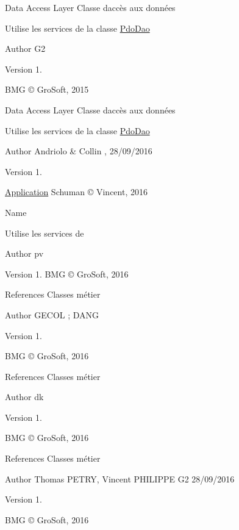Data Access Layer Classe d\textquotesingle{}accès aux données

Utilise les services de la classe \hyperlink{class_pdo_dao}{Pdo\+Dao}

\begin{DoxyAuthor}{Author}
G2 
\end{DoxyAuthor}
\begin{DoxyVersion}{Version}
1.
\end{DoxyVersion}
B\+MG © Gro\+Soft, 2015

Data Access Layer Classe d\textquotesingle{}accès aux données

Utilise les services de la classe \hyperlink{class_pdo_dao}{Pdo\+Dao}

\begin{DoxyAuthor}{Author}
Andriolo \& Collin , 28/09/2016 
\end{DoxyAuthor}
\begin{DoxyVersion}{Version}
1.
\end{DoxyVersion}
\hyperlink{class_application}{Application} Schuman © Vincent, 2016

Name

Utilise les services de

\begin{DoxyAuthor}{Author}
pv 
\end{DoxyAuthor}
\begin{DoxyVersion}{Version}
1. B\+MG © Gro\+Soft, 2016
\end{DoxyVersion}
References Classes métier

\begin{DoxyAuthor}{Author}
G\+E\+C\+OL ; D\+A\+NG 
\end{DoxyAuthor}
\begin{DoxyVersion}{Version}
1.
\end{DoxyVersion}
B\+MG © Gro\+Soft, 2016

References Classes métier

\begin{DoxyAuthor}{Author}
dk 
\end{DoxyAuthor}
\begin{DoxyVersion}{Version}
1.
\end{DoxyVersion}
B\+MG © Gro\+Soft, 2016

References Classes métier

\begin{DoxyAuthor}{Author}
Thomas P\+E\+T\+RY, Vincent P\+H\+I\+L\+I\+P\+PE G2 28/09/2016 
\end{DoxyAuthor}
\begin{DoxyVersion}{Version}
1.
\end{DoxyVersion}
B\+MG © Gro\+Soft, 2016

